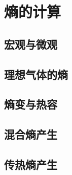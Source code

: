 

\section{熵的计算}\label{11-4}

\subsection{宏观与微观}\label{11-4-1}

\subsection{理想气体的熵}\label{11-4-2}

\subsection{熵变与热容}\label{11-4-3}

\subsection{混合熵产生}\label{11-4-4}

\subsection{传热熵产生}\label{11-4-5}